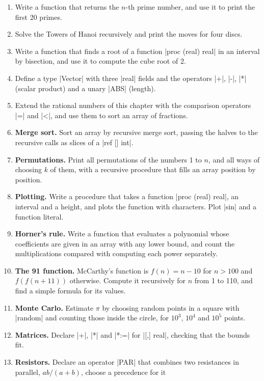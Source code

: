\begin{enumerate}
\item Write a function that returns the $n$-th prime number, and use it
  to print the first 20 primes.
\item Solve the Towers of Hanoi recursively and print the moves for four
  discs.
\item Write a function that finds a root of a function
  \code|proc (real) real| in an interval by bisection, and use it to
  compute the cube root of 2.
\item Define a type \code|Vector| with three \code|real| fields and the
  operators \code|+|, \code|-|, \code|*| (scalar product) and a unary
  \code|ABS| (length).
\item Extend the rational numbers of this chapter with the comparison
  operators \code|=| and \code|<|, and use them to sort an array of
  fractions.
\item \textbf{Merge sort.} Sort an array by recursive merge sort,
  passing the halves to the recursive calls as slices of a
  \code|ref [] int|.
\item \textbf{Permutations.} Print all permutations of the numbers 1 to
  $n$, and all ways of choosing $k$ of them, with a recursive procedure
  that fills an array position by position.
\item \textbf{Plotting.} Write a procedure that takes a function
  \code|proc (real) real|, an interval and a height, and plots the
  function with characters. Plot \code|sin| and a function literal.
\item \textbf{Horner's rule.} Write a function that evaluates a
  polynomial whose coefficients are given in an array with any lower
  bound, and count the multiplications compared with computing each power
  separately.
\item \textbf{The 91 function.} McCarthy's function is
  $f(n) = n - 10$ for $n > 100$ and $f(f(n + 11))$ otherwise. Compute it
  recursively for $n$ from 1 to 110, and find a simple formula for its
  values.
\item \textbf{Monte Carlo.} Estimate $\pi$ by choosing random points in
  a square with \code|random| and counting those inside the circle, for
  $10^3$, $10^4$ and $10^5$ points.
\item \textbf{Matrices.} Declare \code|+|, \code|*| and \code|*:=| for
  \code|[,] real|, checking that the bounds fit.
\item \textbf{Resistors.} Declare an operator \code|PAR| that combines
  two resistances in parallel, $ab/(a + b)$, choose a precedence for it

\end{enumerate}
